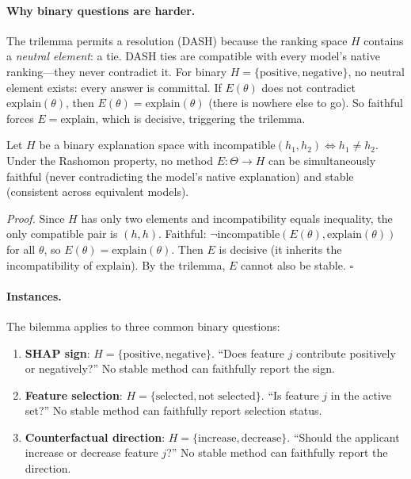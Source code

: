 \documentclass{jmlr}
\begin{document}
\paragraph{Why binary questions are harder.}
The trilemma permits a resolution (DASH) because the ranking space $H$ contains a \emph{neutral element}: a tie.
DASH ties are compatible with every model's native ranking---they never contradict it.
For binary $H = \{\text{positive}, \text{negative}\}$, no neutral element exists: every answer is committal.
If $E(\theta)$ does not contradict $\text{explain}(\theta)$, then $E(\theta) = \text{explain}(\theta)$ (there is nowhere else to go).
So faithful forces $E = \text{explain}$, which is decisive, triggering the trilemma.

\begin{theorem}\label{thm:bilemma}
Let $H$ be a binary explanation space with $\text{incompatible}(h_1, h_2) \Leftrightarrow h_1 \neq h_2$.
Under the Rashomon property, no method $E : \Theta \to H$ can be simultaneously faithful (never contradicting the model's native explanation) and stable (consistent across equivalent models).
\end{theorem}

\noindent\textit{Proof.}
Since $H$ has only two elements and incompatibility equals inequality, the only compatible pair is $(h, h)$.
Faithful: $\neg\text{incompatible}(E(\theta), \text{explain}(\theta))$ for all $\theta$, so $E(\theta) = \text{explain}(\theta)$.
Then $E$ is decisive (it inherits the incompatibility of $\text{explain}$).
By the trilemma, $E$ cannot also be stable. \hfill$\square$

\paragraph{Instances.}
The bilemma applies to three common binary questions:
\begin{enumerate}
\item \textbf{SHAP sign}: $H = \{\text{positive}, \text{negative}\}$. ``Does feature $j$ contribute positively or negatively?'' No stable method can faithfully report the sign.
\item \textbf{Feature selection}: $H = \{\text{selected}, \text{not selected}\}$. ``Is feature $j$ in the active set?'' No stable method can faithfully report selection status.
\item \textbf{Counterfactual direction}: $H = \{\text{increase}, \text{decrease}\}$. ``Should the applicant increase or decrease feature $j$?'' No stable method can faithfully report the direction.
\end{enumerate}
\end{document}

